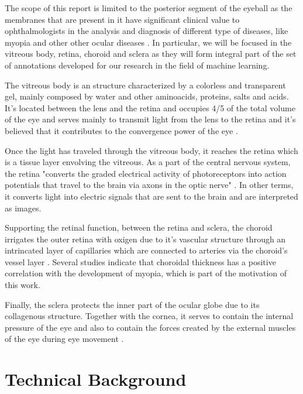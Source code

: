\documentclass[12pt,a4paper]{scrartcl}
\begin{document}
The scope of this report is limited to the posterior segment of the eyeball as the membranes that are present in it have significant clinical value to ophthalmologists in the analysis and diagnosis of different type of diseases, like myopia and other other ocular diseases \cite{Ronchetti2017}. In particular, we will be focused in the vitreous body, retina, choroid and sclera as they will form integral part of the set of annotations developed for our research in the field of machine learning. 

The vitreous body is an structure characterized by a colorless and transparent gel, mainly composed by water and other aminoacids, proteins, salts and acids. It's located between the lens and the retina and occupies 4/5 of the total volume of the eye and serves mainly to transmit light from the lens to the retina and it's believed that it contributes to the convergence power of the eye \cite{snell1998}. 

Once the light has traveled through the vitreous body, it reaches the retina which is a tissue layer envolving the vitreous. As a part of the central nervous system, the retina "converts the graded electrical activity of photoreceptors into action potentials that travel to the brain via axons in the optic nerve" \cite{purves2001}. In other terms, it converts light into electric signals that are sent to the brain and are interpreted as images.

Supporting the retinal function, between the retina and sclera, the choroid irrigates the outer retina with oxigen due to it's vascular structure through an intrincated layer of capillaries which are connected to arteries via the choroid's vessel layer \cite{snell1998}\cite{choroidExpl}. Several studies \cite{ronchetti2019}\cite{Ronchetti2018} indicate that choroidal thickness has a positive correlation with the development of myopia, which is part of the motivation of this work. 

Finally, the sclera protects the inner part of the ocular globe due to its collagenous structure. Together with the cornea, it serves to contain the internal pressure of the eye and also to contain the forces created by the external muscles of the eye during eye movement \cite{Meek2008}.

\section{Technical Background}\label{TechBack}
\end{document}
